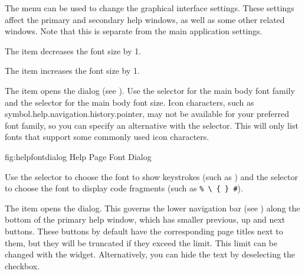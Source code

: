 The  menu can be used to change the
graphical interface settings. These settings affect the primary and
secondary help windows, as well as some other related windows.
Note that this is separate from the main application settings.


The  item decreases the font
size by 1.


The  item increases the font
size by 1.


The  item opens the
 dialog (see
). Use the
 selector for the main body font
family and the  selector for the
main body font size. Icon characters, such as
\gls{symbol.help.navigation.history.pointer}, may not be available
for your preferred font family, so you can specify an alternative
with the  selector. This
will only list fonts that support some commonly used icon
characters.

\FloatFig
{fig:helpfontdialog}
{%
}
{Help Page Font Dialog}

Use the  selector to
choose the font to show keystrokes (such as
) and the
 selector to choose the
font to display code fragments (such as \verb|% \ { } #|).


The  item opens the
 dialog. This governs the
lower navigation bar (see ) along the
bottom of the primary help window, which has smaller previous, up and next
buttons.  These buttons by default have the corresponding page
titles next to them, but they will be truncated if they exceed the
limit. This limit can be changed with the
 widget. Alternatively, you
can hide the text by deselecting the
 checkbox.


